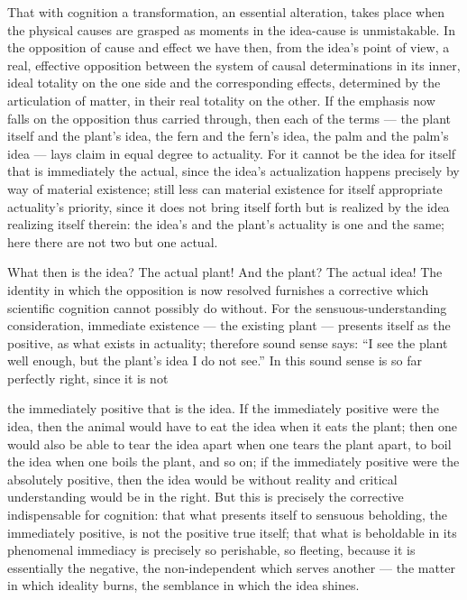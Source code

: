 \documentclass[12pt,a4paper]{book}
\begin{document}
That with cognition a transformation, an essential alteration, takes place when
the physical causes are grasped as moments in the idea-cause is unmistakable. In
the opposition of cause and effect we have then, from the idea's point of view, a
real, effective opposition between the system of causal determinations in its
inner, ideal totality on the one side and the corresponding effects, determined by
the articulation of matter, in their real totality on the other. If the emphasis
now falls on the opposition thus carried through, then each of the terms --- the
plant itself and the plant's idea, the fern and the fern's idea, the palm and the
palm's idea --- lays claim in equal degree to actuality. For it cannot be the idea
for itself that is immediately the actual, since the idea's actualization happens
precisely by way of material existence; still less can material existence for
itself appropriate actuality's priority, since it does not bring itself forth but
is realized by the idea realizing itself therein: the idea's and the plant's
actuality is one and the same; here there are not two but one actual.

What then is the idea? The actual plant! And the plant? The actual idea! The
identity in which the opposition is now resolved furnishes a corrective which
scientific cognition cannot possibly do without. For the sensuous-understanding
consideration, immediate existence --- the existing plant --- presents itself as
the positive, as what exists in actuality; therefore sound sense says: ``I see the
plant well enough, but the plant's idea I do not see.'' In this sound sense is so
far perfectly right, since it is not

\setcounter{footnote}{0}
the immediately positive that is the idea. If the immediately positive were the
idea, then the animal would have to eat the idea when it eats the plant; then one
would also be able to tear the idea apart when one tears the plant apart, to boil
the idea when one boils the plant, and so on; if the immediately positive were the
absolutely positive, then the idea would be without reality and critical
understanding would be in the right. But this is precisely the corrective
indispensable for cognition: that what presents itself to sensuous beholding, the
immediately positive, is not the positive true itself; that what is beholdable in
its phenomenal immediacy is precisely so perishable, so fleeting, because it is
essentially the negative, the non-independent which serves another --- the matter
in which ideality burns, the semblance in which the idea shines.
\end{document}
